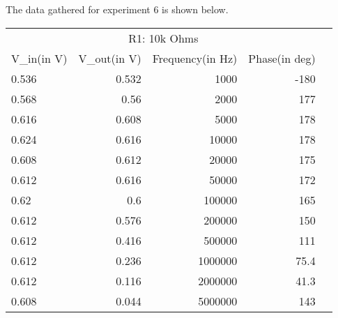 The data gathered for experiment 6 is shown below.


\begin{table}[!htp]\centering
    \scriptsize
    \begin{tabular}{lrrrr}\toprule
        \multicolumn{4}{c}{R1: 10k Ohms}                              \\\cmidrule{1-4}
        V\_in(in V) & V\_out(in V) & Frequency(in Hz) & Phase(in deg) \\\midrule
        0.536       & 0.532        & 1000             & -180          \\
        0.568       & 0.56         & 2000             & 177           \\
        0.616       & 0.608        & 5000             & 178           \\
        0.624       & 0.616        & 10000            & 178           \\
        0.608       & 0.612        & 20000            & 175           \\
        0.612       & 0.616        & 50000            & 172           \\
        0.62        & 0.6          & 100000           & 165           \\
        0.612       & 0.576        & 200000           & 150           \\
        0.612       & 0.416        & 500000           & 111           \\
        0.612       & 0.236        & 1000000          & 75.4          \\
        0.612       & 0.116        & 2000000          & 41.3          \\
        0.608       & 0.044        & 5000000          & 143           \\
        \bottomrule
    \end{tabular}
\end{table}


